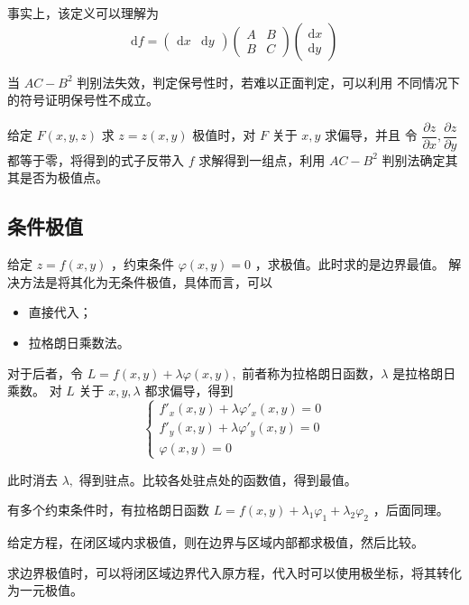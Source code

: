 事实上，该定义可以理解为$$
    \mathrm{d}f = \begin{pmatrix}
        \mathrm{d}x & \mathrm{d}y
    \end{pmatrix}\begin{pmatrix}
        A&B\\B&C
    \end{pmatrix}\begin{pmatrix}
        \mathrm{d}x\\\mathrm{d}y
    \end{pmatrix}
$$ 

当 $ AC-B^2 $ 判别法失效，判定保号性时，若难以正面判定，可以利用
不同情况下的符号证明保号性不成立。

给定 $ F(x,y,z) $ 求 $ z = z(x,y) $ 极值时，对 $ F $ 关于 $ x,y $ 求偏导，并且
令 $ \dfrac{\partial z}{\partial x},\dfrac{\partial z}{\partial y} $ 
都等于零，将得到的式子反带入 $ f $ 求解得到一组点，利用 $ AC-B^2 $ 判别法确定其
其是否为极值点。

\subsection{条件极值}

给定 $ z = f(x,y) $ ，约束条件 $ \varphi(x,y) = 0 $ ，求极值。此时求的是边界最值。
解决方法是将其化为无条件极值，具体而言，可以
\begin{itemize}
    \item 直接代入；
    \item 拉格朗日乘数法。
\end{itemize}

对于后者，令 $ L = f(x,y) + \lambda\varphi(x,y), $ 前者称为拉格朗日函数，$ \lambda $ 是拉格朗日乘数。
对 $ L $ 关于 $ x,y,\lambda $ 都求偏导，得到
$$
    \begin{cases}
        f'_x(x,y) + \lambda\varphi'_x(x,y) = 0\\ 
        f'_y(x,y) + \lambda\varphi'_y(x,y) = 0\\ 
        \varphi(x,y) = 0
    \end{cases}
$$ 

此时消去 $ \lambda, $ 得到驻点。比较各处驻点处的函数值，得到最值。

有多个约束条件时，有拉格朗日函数 $ L = f(x,y) + \lambda_1\varphi_1 + \lambda_2\varphi_2 $ ，后面同理。

给定方程，在闭区域内求极值，则在边界与区域内部都求极值，然后比较。

求边界极值时，可以将闭区域边界代入原方程，代入时可以使用极坐标，将其转化为一元极值。

